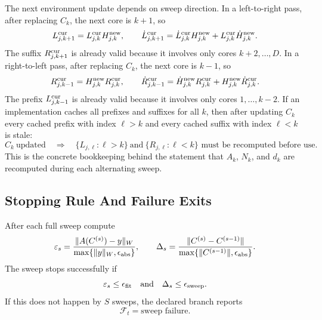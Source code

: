 \documentclass[11pt]{article}
\numberwithin{equation}{section}
\begin{document}
The next environment update depends on sweep direction.  In a left-to-right
pass, after replacing \(C_k\), the next core is \(k+1\), so
\begin{equation}
    L_{j,k+1}^{\rm cur}
    =
    L_{j,k}^{\rm cur}H_{j,k}^{\rm new},
    \qquad
    \dot L_{j,k+1}^{\rm cur}
    =
    \dot L_{j,k}^{\rm cur}H_{j,k}^{\rm new}
    +
    L_{j,k}^{\rm cur}\dot H_{j,k}^{\rm new}.
    \label{eq:p26-sweep-recompute-10}
\end{equation}
The suffix \(R_{j,k+1}^{\rm cur}\) is already valid because it involves only
cores \(k+2,\ldots,D\).  In a right-to-left pass, after replacing \(C_k\), the
next core is \(k-1\), so
\begin{equation}
    R_{j,k-1}^{\rm cur}
    =
    H_{j,k}^{\rm new}R_{j,k}^{\rm cur},
    \qquad
    \dot R_{j,k-1}^{\rm cur}
    =
    \dot H_{j,k}^{\rm new}R_{j,k}^{\rm cur}
    +
    H_{j,k}^{\rm new}\dot R_{j,k}^{\rm cur}.
    \label{eq:p26-sweep-recompute-11}
\end{equation}
The prefix \(L_{j,k-1}^{\rm cur}\) is already valid because it involves only
cores \(1,\ldots,k-2\).  If an implementation caches all prefixes and suffixes
for all \(k\), then after updating \(C_k\) every cached prefix with index
\(\ell>k\) and every cached suffix with index \(\ell<k\) is stale:
\begin{equation}
    C_k\ \text{updated}
    \quad\Longrightarrow\quad
    \{L_{j,\ell}:\ell>k\}\ \text{and}\ \{R_{j,\ell}:\ell<k\}
    \text{ must be recomputed before use}.
    \label{eq:p26-sweep-recompute-12}
\end{equation}
This is the concrete bookkeeping behind the statement that \(A_k\), \(N_k\),
and \(d_k\) are recomputed during each alternating sweep.

\subsection{Stopping Rule And Failure Exits}

After each full sweep compute
\begin{equation}
    \varepsilon_s
    =
    \frac{\|A(C^{(s)})-y\|_W}{\max\{\|y\|_W,\epsilon_{\rm abs}\}},
    \qquad
    \Delta_s
    =
    \frac{\|C^{(s)}-C^{(s-1)}\|}{\max\{\|C^{(s-1)}\|,\epsilon_{\rm abs}\}}.
    \label{eq:p25-ls-21}
\end{equation}
The sweep stops successfully if
\begin{equation}
    \varepsilon_s\le\epsilon_{\rm fit}
    \quad\text{and}\quad
    \Delta_s\le\epsilon_{\rm sweep}.
    \label{eq:p25-ls-22}
\end{equation}
If this does not happen by \(S\) sweeps, the declared branch reports
\begin{equation}
    \mathcal F_t=\text{sweep failure}.
    \label{eq:p25-ls-23}
\end{equation}
\end{document}
